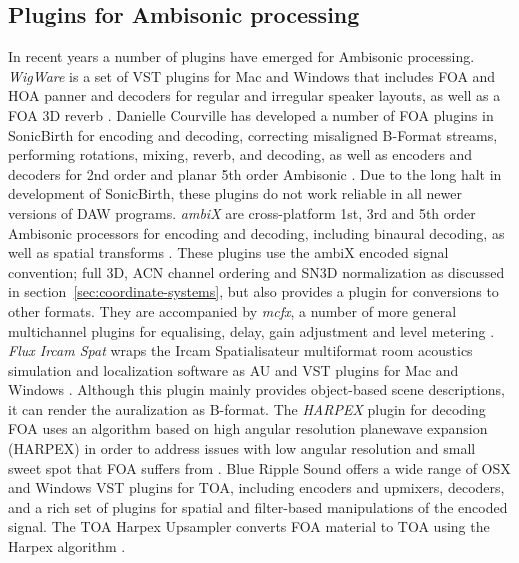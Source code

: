 \documentclass{article}
\begin{document}
\subsection{Plugins for Ambisonic processing}\label{sec:ambi-plugins}

In recent years a number of plugins have emerged for Ambisonic processing.
\emph{WigWare} is a set of VST plugins for Mac and Windows that includes FOA and HOA panner and decoders for regular and irregular speaker layouts, as well as a FOA 3D reverb \cite{Wiggins:2010wigware}.
Danielle Courville has developed a number of FOA plugins in SonicBirth for encoding and decoding, correcting misaligned B-Format streams, performing rotations, mixing, reverb, and decoding, as well as encoders and decoders for 2nd order and planar 5th order Ambisonic \cite{courville:2012b2x}.
Due to the long halt in development of SonicBirth, these plugins do not work reliable in all newer versions of DAW programs.
\emph{ambiX} are cross-platform 1st, 3rd and 5th order Ambisonic processors for encoding and decoding, including binaural decoding, as well as spatial transforms \cite{Kronlachner2013:ambix,Kronlachner:2014ambi-transforms}.
These plugins use the ambiX encoded signal convention; full 3D, ACN channel ordering and SN3D normalization \cite{Nachbar:2011ambix} as discussed in section~\ref{sec:coordinate-systems}, but also provides a plugin for conversions to other formats.
They are accompanied by \emph{mcfx}, a number of more general multichannel plugins for equalising, delay, gain adjustment and level metering \cite{kronlachner2014:mcfx}.
\emph{Flux Ircam Spat} wraps the Ircam Spatialisateur multiformat room acoustics simulation and localization software as AU and VST plugins for Mac and Windows \cite{flux:2010spat}.
Although this plugin mainly provides object-based scene descriptions, it can render the auralization as B-format.
The \emph{HARPEX} plugin for decoding FOA uses an algorithm based on high angular resolution planewave expansion (HARPEX) in order to address issues with low angular resolution and small sweet spot that FOA suffers from \cite{Berge:2010harpex}.
Blue Ripple Sound offers a wide range of OSX and Windows VST plugins for TOA, including encoders and upmixers, decoders, and a rich set of plugins for spatial and filter-based manipulations of the encoded signal.
The TOA Harpex Upsampler converts FOA material to TOA using the Harpex algorithm \cite{blueripple:2014TOA}.




\end{document}
